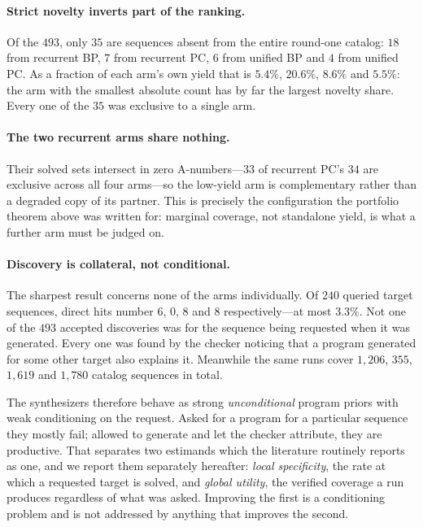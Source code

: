 \documentclass[11pt]{article}
\begin{document}
\paragraph{Strict novelty inverts part of the ranking.}
Of the $493$, only $35$ are sequences absent from the entire round-one catalog:
$18$ from recurrent BP, $7$ from recurrent PC, $6$ from unified BP and $4$ from unified
PC. As a fraction of each arm's own yield that is $5.4\%$, $20.6\%$, $8.6\%$ and
$5.5\%$: the arm with the smallest absolute count has by far the largest novelty share.
Every one of the $35$ was exclusive to a single arm.

\paragraph{The two recurrent arms share nothing.}
Their solved sets intersect in zero A-numbers---$33$ of recurrent PC's $34$ are
exclusive across all four arms---so the low-yield arm is complementary rather than a
degraded copy of its partner. This is precisely the configuration the portfolio theorem
above was written for: marginal coverage, not standalone yield, is what a further arm
must be judged on.

\paragraph{Discovery is collateral, not conditional.}
The sharpest result concerns none of the arms individually. Of $240$ queried target
sequences, direct hits number $6$, $0$, $8$ and $8$ respectively---at most $3.3\%$. Not
one of the $493$ accepted discoveries was for the sequence being requested when it was
generated. Every one was found by the checker noticing that a program generated for some
other target also explains it. Meanwhile the same runs cover $1{,}206$, $355$, $1{,}619$
and $1{,}780$ catalog sequences in total.

The synthesizers therefore behave as strong \emph{unconditional} program priors with
weak conditioning on the request. Asked for a program for a particular sequence they
mostly fail; allowed to generate and let the checker attribute, they are productive.
That separates two estimands which the literature routinely reports as one, and we
report them separately hereafter: \emph{local specificity}, the rate at which a
requested target is solved, and \emph{global utility}, the verified coverage a run
produces regardless of what was asked. Improving the first is a conditioning problem
and is not addressed by anything that improves the second.
\end{document}
